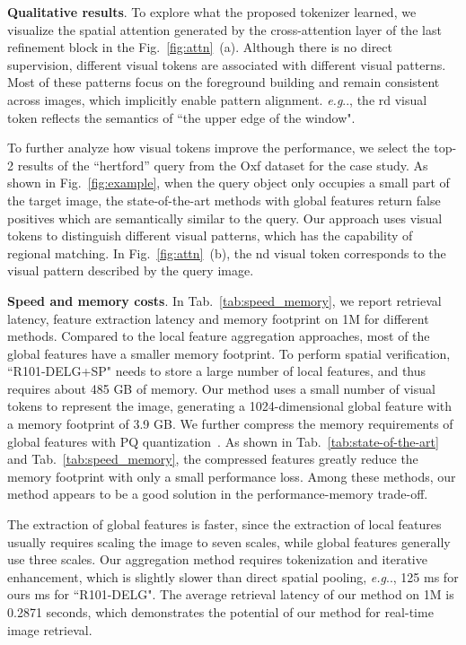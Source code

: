 \documentclass[letterpaper]{article} \usepackage{aaai22}  \usepackage{times}  \usepackage{helvet}  \usepackage{courier}  \usepackage[hyphens]{url}  \usepackage{graphicx} \urlstyle{rm} \def\UrlFont{\rm}  \usepackage{natbib}  \usepackage{caption} \DeclareCaptionStyle{ruled}{labelfont=normalfont,labelsep=colon,strut=off} \frenchspacing  \setlength{\pdfpagewidth}{8.5in}  \setlength{\pdfpageheight}{11in}  \usepackage{algorithm}
\makeatletter
\DeclareRobustCommand\onedot{\futurelet\@let@token\@onedot}
\def\@onedot{\ifx\@let@token.\else.\null\fi\xspace}
\def\eg{\emph{e.g}\onedot} \def\Eg{\emph{E.g}\onedot}
\makeatother
\begin{document}
\noindent\textbf{Qualitative results}. 
To explore what the proposed tokenizer learned, we visualize the spatial attention generated by the cross-attention layer of the last refinement block in the Fig.~\ref{fig:attn}~(a).
Although there is no direct supervision, different visual tokens are associated with different visual patterns. 
Most of these patterns focus on the foreground building and remain consistent across images, which implicitly enable pattern alignment. 
\eg, the rd visual token reflects the semantics of ``the upper edge of the window".

To further analyze how visual tokens improve the performance, we select the top-2 results of
the ``hertford'' query from the Oxf dataset for the case study. 
As shown in Fig.~\ref{fig:example}, when the query object only occupies a small part of the target image, the state-of-the-art methods with global features return false positives which are semantically similar to the query. 
Our approach uses visual tokens to distinguish different visual patterns, which has the capability of regional matching. In Fig.~\ref{fig:attn}~(b), the nd visual token corresponds to the visual pattern described by the query image.

\noindent\textbf{Speed and memory costs}.
In Tab.~\ref{tab:speed_memory}, we report retrieval latency, feature extraction latency and memory footprint on 1M for different methods.
Compared to the local feature aggregation approaches, most of the global features have a smaller memory footprint.
To perform spatial verification, ``R101-DELG+SP" needs to store a large number of local features, and thus requires about 485 GB of memory.
Our method uses a small number of visual tokens to represent the image, generating a 1024-dimensional global feature with a memory footprint of 3.9 GB. We further compress the memory requirements of global features with PQ quantization~\cite{PQ}.
As shown in Tab.~\ref{tab:state-of-the-art} and Tab.~\ref{tab:speed_memory},  the compressed features greatly reduce the memory footprint with only a small performance loss. 
Among these methods, our method appears to be a good solution in the performance-memory trade-off.

The extraction of global features is faster, since the extraction of local features usually requires scaling the image to seven scales, while global features generally use three scales.
Our aggregation method requires tokenization and iterative enhancement, which is slightly slower than direct spatial pooling, \eg, 125 ms for ours  ms for ``R101-DELG". 
The average retrieval latency of our method on 1M is 0.2871 seconds, which demonstrates the potential of our method for real-time image retrieval.
\end{document}
